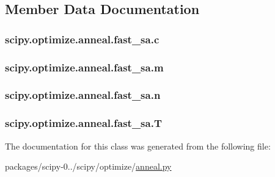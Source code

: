 \subsection{Member Data Documentation}
\hypertarget{classscipy_1_1optimize_1_1anneal_1_1fast__sa_a28557e4b493e347ed9bd8cecaa9a777f}{}
\subsubsection[{c}]{\setlength{\rightskip}{0pt plus 5cm}scipy.\+optimize.\+anneal.\+fast\+\_\+sa.\+c}\label{classscipy_1_1optimize_1_1anneal_1_1fast__sa_a28557e4b493e347ed9bd8cecaa9a777f}
\hypertarget{classscipy_1_1optimize_1_1anneal_1_1fast__sa_ac61ef5fd90499f3c5c6c8090b3f8da0a}{}
\subsubsection[{m}]{\setlength{\rightskip}{0pt plus 5cm}scipy.\+optimize.\+anneal.\+fast\+\_\+sa.\+m}\label{classscipy_1_1optimize_1_1anneal_1_1fast__sa_ac61ef5fd90499f3c5c6c8090b3f8da0a}
\hypertarget{classscipy_1_1optimize_1_1anneal_1_1fast__sa_a6f59bc186b25426cc8681e03ff041b95}{}
\subsubsection[{n}]{\setlength{\rightskip}{0pt plus 5cm}scipy.\+optimize.\+anneal.\+fast\+\_\+sa.\+n}\label{classscipy_1_1optimize_1_1anneal_1_1fast__sa_a6f59bc186b25426cc8681e03ff041b95}
\hypertarget{classscipy_1_1optimize_1_1anneal_1_1fast__sa_a7a7db061a70764ec3896039a5887112f}{}
\subsubsection[{T}]{\setlength{\rightskip}{0pt plus 5cm}scipy.\+optimize.\+anneal.\+fast\+\_\+sa.\+T}\label{classscipy_1_1optimize_1_1anneal_1_1fast__sa_a7a7db061a70764ec3896039a5887112f}


The documentation for this class was generated from the following file\+:\begin{DoxyCompactItemize}
\item 
packages/scipy-\/0../scipy/optimize/\hyperlink{anneal_8py}{anneal.\+py}\end{DoxyCompactItemize}
